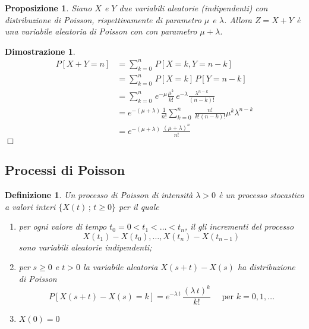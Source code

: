 \documentclass{article}
\newtheorem{definizione}{Definizione}[section]
\newtheorem{proposizione}{Proposizione}[section]
\newtheorem{dimostrazione}{Dimostrazione}
\newcommand*{\QED}{\hfill\ensuremath{\Box}}
\begin{document}
\begin{proposizione}
\label{pp_somma_due_poisson}
Siano $X$ e $Y$ due variabili aleatorie (indipendenti) con distribuzione di Poisson, rispettivamente di parametro $\mu$ e $\lambda$. Allora $Z = X + Y$ è una variabile aleatoria di Poisson con con parametro $\mu + \lambda$.
\end{proposizione}
\begin{dimostrazione}
\begin{align*}
P[X + Y = n] &= \sum_{k=0}^n\,P[X=k,Y=n-k]\\
&= \sum_{k=0}^n\,P[X = k]\,P[Y = n-k]\\
&= \sum_{k = 0}^n\,e^{-\mu}\frac{\mu^k}{k!}\,e^{-\lambda}\frac{\lambda^{n-k}}{(n-k)!}\\
&= e^{-(\mu+\lambda)}\frac{1}{n!}\sum_{k=0}^n\,\frac{n!}{k!(n-k)!}\mu^k\lambda^{n-k}\\
&= e^{-(\mu+\lambda)}\,\frac{(\mu+\lambda)^n}{n!}
\end{align*}
\QED
\end{dimostrazione}

\subsection{Processi di Poisson}

\begin{definizione}
Un processo di Poisson di intensità $\lambda > 0$ è un processo stocastico a valori interi $\{X(t)\,;\,t \ge 0\}$ per il quale
\begin{enumerate}
    \item per ogni valore di tempo $t_0 = 0 < t_1 < \hdots < t_n$, il gli incrementi del processo
    $$
    X(t_1) - X(t_0), \hdots, X(t_n) - X(t_{n-1})
    $$
    sono variabili aleatorie indipendenti;
    \item per $s \ge 0$ e $t > 0$ la variabile aleatoria $X(s+t) - X(s)$ ha distribuzione di Poisson
    $$
    P[X(s+t) - X(s) = k] = e^{-\lambda\,t}\,\frac{(\lambda\,t)^k}{k!} \quad \text{ per } k=0,1,\hdots
    $$
    \item $X(0) = 0$
\end{enumerate}
\end{definizione}
\end{document}
